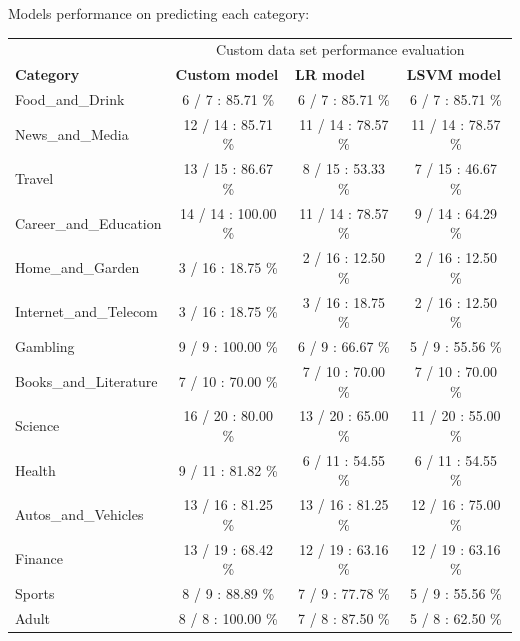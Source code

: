 \begin{enumerate}
\pagebreak
Models performance on predicting each category:

 \begin{table}[H]
        \centering
        \begin{tabular}{l|c|c|c|}
            \hline
            \multicolumn{1}{c}{}  & \multicolumn{3}{|c|}{Custom data set performance evaluation}\\\cline{2-4}
            \textbf{Category} & \multicolumn{1}{l|}{\textbf{Custom model}} & \multicolumn{1}{l|}{\textbf{LR model}} & \multicolumn{1}{l|}{\textbf{LSVM model}} \\ \hline
            Food\_and\_Drink & 6 / 7 : 85.71 \% & 6 / 7 : 85.71 \% & 6 / 7 : 85.71 \% \\ \cline{2-4} 
            News\_and\_Media &  12 / 14 : 85.71 \% & 11 / 14 : 78.57 \% & 11 / 14 : 78.57 \%  \\ \cline{2-4} 
            Travel & 13 / 15 : 86.67 \% & 8 / 15 : 53.33 \% & 7 / 15 : 46.67 \%  \\ \cline{2-4} 
            Career\_and\_Education & 14 / 14 : 100.00 \% & 11 / 14 : 78.57 \% & 9 / 14 : 64.29 \% \\ \cline{2-4} 
            Home\_and\_Garden & 3 / 16 : 18.75 \% & 2 / 16 : 12.50 \% & 2 / 16 : 12.50 \% \\ \cline{2-4} 
            Internet\_and\_Telecom & 3 / 16 : 18.75 \% & 3 / 16 : 18.75 \% & 2 / 16 : 12.50 \% \\ \cline{2-4} 
            Gambling & 9 / 9 : 100.00 \% &  6 / 9 : 66.67 \% & 5 / 9 : 55.56 \% \\ \cline{2-4} 
            Books\_and\_Literature & 7 / 10 : 70.00 \% & 7 / 10 : 70.00 \% & 7 / 10 : 70.00 \% \\ \cline{2-4} 
            Science & 16 / 20 : 80.00 \% & 13 / 20 : 65.00 \% & 11 / 20 : 55.00 \% \\ \cline{2-4} 
            Health & 9 / 11 : 81.82 \% & 6 / 11 : 54.55 \% & 6 / 11 : 54.55 \%  \\ \cline{2-4} 
            Autos\_and\_Vehicles & 13 / 16 : 81.25 \% & 13 / 16 : 81.25 \% & 12 / 16 : 75.00 \% \\ \cline{2-4} 
            Finance & 13 / 19 : 68.42 \% & 12 / 19 : 63.16 \% & 12 / 19 : 63.16 \% \\ \cline{2-4} 
            Sports & 8 / 9 : 88.89 \% & 7 / 9 : 77.78 \% & 5 / 9 : 55.56 \% \\ \cline{2-4} 
            Adult & 8 / 8 : 100.00 \% & 7 / 8 : 87.50 \% & 5 / 8 : 62.50 \% \\ \cline{2-4} 

\end{tabular}
\end{table}
\end{enumerate}
